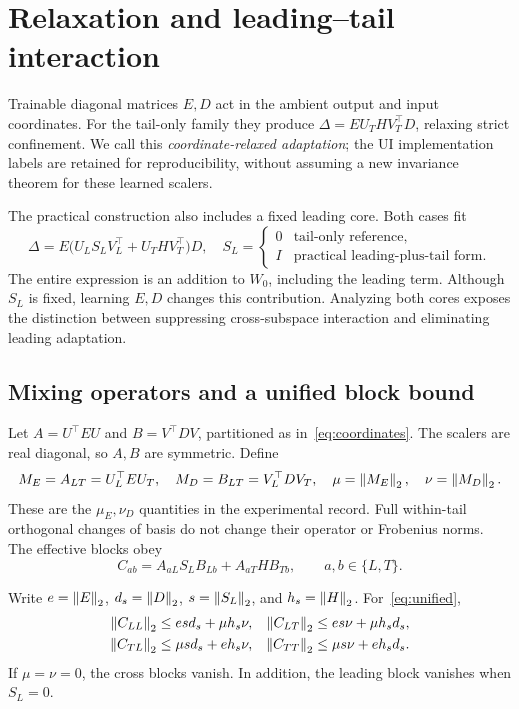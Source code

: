 \section{Relaxation and leading--tail interaction}
\label{sec:mixing}

Trainable diagonal matrices $E,D$ act in the ambient output and input coordinates. For the tail-only family they produce $\Delta=E U_T H V_T^\top D$, relaxing strict confinement. We call this \emph{coordinate-relaxed adaptation}; the UI implementation labels are retained for reproducibility, without assuming a new invariance theorem for these learned scalers.

The practical construction also includes a fixed leading core. Both cases fit
\begin{equation}
\Delta=E\bigl(U_L S_L V_L^\top+U_T H V_T^\top\bigr)D,
\quad
S_L=\begin{cases}0&\text{tail-only reference},\\I&\text{practical leading-plus-tail form}.
\end{cases}
\label{eq:unified}
\end{equation}
The entire expression is an addition to $W_0$, including the leading term. Although $S_L$ is fixed, learning $E,D$ changes this contribution. Analyzing both cores exposes the distinction between suppressing cross-subspace interaction and eliminating leading adaptation.

\subsection{Mixing operators and a unified block bound}
Let $A=U^\top E U$ and $B=V^\top D V$, partitioned as in~\eqref{eq:coordinates}. The scalers are real diagonal, so $A,B$ are symmetric. Define
\begin{equation}
M_E=A_{LT}=U_L^\top E U_T,\quad
M_D=B_{LT}=V_L^\top D V_T,\quad
\mu=\left\|M_E\right\|_2,\quad\nu=\left\|M_D\right\|_2.
\label{eq:mixingoperators}
\end{equation}
These are the $\mu_E,\nu_D$ quantities in the experimental record. Full within-tail orthogonal changes of basis do not change their operator or Frobenius norms. The effective blocks obey
\begin{equation}
C_{ab}=A_{aL}S_LB_{Lb}+A_{aT}HB_{Tb},\qquad a,b\in\{L,T\}.
\label{eq:blockidentity}
\end{equation}

\begin{proposition}
\label{prop:mixing}
Write $e=\left\|E\right\|_2$, $d_s=\left\|D\right\|_2$, $s=\left\|S_L\right\|_2$, and $h_s=\left\|H\right\|_2$. For~\eqref{eq:unified},
\begin{align}
\left\|C_{LL}\right\|_2&\le e s d_s+\mu h_s\nu, &
\left\|C_{LT}\right\|_2&\le e s\nu+\mu h_s d_s,\label{eq:blockbound1}\\
\left\|C_{TL}\right\|_2&\le\mu s d_s+e h_s\nu, &
\left\|C_{TT}\right\|_2&\le\mu s\nu+e h_s d_s.\label{eq:blockbound2}
\end{align}
If $\mu=\nu=0$, the cross blocks vanish. In addition, the leading block vanishes when $S_L=0$.
\end{proposition}

